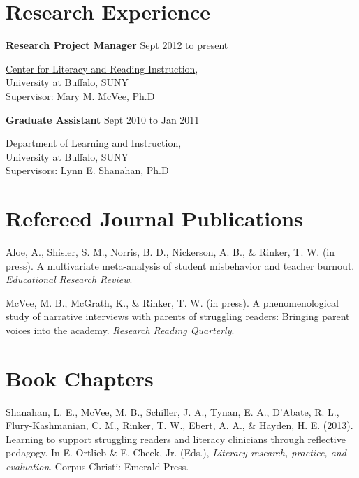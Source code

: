 \section{Research Experience}

\textbf{Research Project Manager} \hfill {Sept 2012 to present}
\begin{innerlist}

\item[] \href{http://clari.buffalo.edu}{Center for Literacy and Reading Instruction},\\
        University at Buffalo, SUNY\\
        Supervisor: Mary M. McVee, Ph.D
\end{innerlist}

\textbf{Graduate Assistant} \hfill {Sept 2010 to Jan 2011}
\begin{innerlist}

\item[] Department of Learning and Instruction,\\
        University at Buffalo, SUNY\\
        Supervisors: Lynn E. Shanahan, Ph.D
\end{innerlist}

\section{Refereed Journal Publications}
\vspace{-.1275in}
\begin{bibsection}
    \item Aloe, A., Shisler, S. M., Norris, B. D., Nickerson, A. B., \& Rinker, T. W. (in press). A multivariate meta-analysis of student misbehavior and teacher burnout. \emph{Educational Research Review}.
    \item McVee, M. B., McGrath, K., \& Rinker, T. W. (in press). A phenomenological study of narrative interviews with parents of struggling readers: Bringing parent voices into the academy. \emph{Research Reading Quarterly}.
\end{bibsection}

\halfblankline

\section{Book Chapters}
\vspace{-.1275in}
\begin{bibsection}
    \item Shanahan, L. E., McVee, M. B., Schiller, J. A., Tynan, E. A., D'Abate, R. L., Flury-Kashmanian, C. M., Rinker, T. W., Ebert, A. A., \& Hayden, H. E. (2013). Learning to support struggling readers and literacy clinicians through reflective pedagogy. In E. Ortlieb \& E. Cheek, Jr. (Eds.), \emph{Literacy research, practice, and evaluation}. Corpus Christi: Emerald Press.
\end{bibsection}

